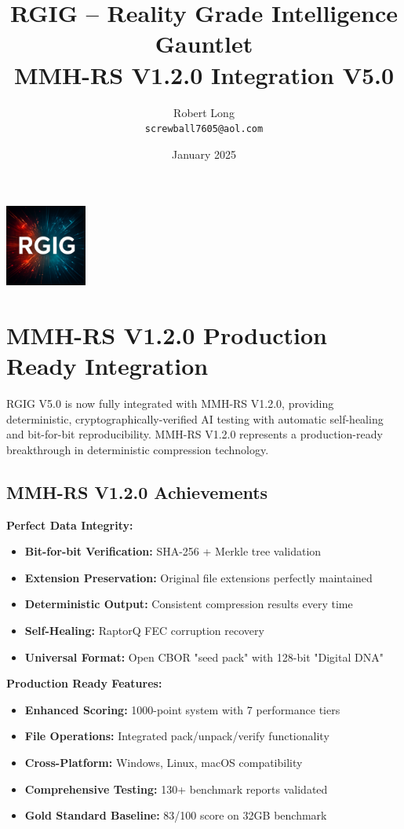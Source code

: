 \documentclass[11pt]{article}
\title{RGIG -- Reality Grade Intelligence Gauntlet\\MMH-RS V1.2.0 Integration V5.0}
\author{Robert Long \\ \texttt{screwball7605@aol.com}}
\date{January 2025}
\begin{document}
\maketitle

\begin{center}
  \includegraphics[width=0.2\textwidth]{RGIG.png}
\end{center}

\section*{MMH-RS V1.2.0 Production Ready Integration}
RGIG V5.0 is now fully integrated with MMH-RS V1.2.0, providing deterministic, cryptographically-verified AI testing with automatic self-healing and bit-for-bit reproducibility. MMH-RS V1.2.0 represents a production-ready breakthrough in deterministic compression technology.

\subsection*{MMH-RS V1.2.0 Achievements}
\textbf{Perfect Data Integrity:}
\begin{itemize}
  \item \textbf{Bit-for-bit Verification:} SHA-256 + Merkle tree validation
  \item \textbf{Extension Preservation:} Original file extensions perfectly maintained
  \item \textbf{Deterministic Output:} Consistent compression results every time
  \item \textbf{Self-Healing:} RaptorQ FEC corruption recovery
  \item \textbf{Universal Format:} Open CBOR "seed pack" with 128-bit "Digital DNA"
\end{itemize}

\textbf{Production Ready Features:}
\begin{itemize}
  \item \textbf{Enhanced Scoring:} 1000-point system with 7 performance tiers
  \item \textbf{File Operations:} Integrated pack/unpack/verify functionality
  \item \textbf{Cross-Platform:} Windows, Linux, macOS compatibility
  \item \textbf{Comprehensive Testing:} 130+ benchmark reports validated
  \item \textbf{Gold Standard Baseline:} 83/100 score on 32GB benchmark
\end{itemize}
\end{document}
